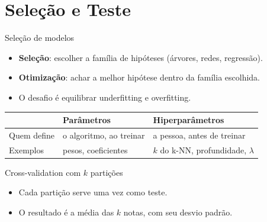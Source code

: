 \documentclass[10pt]{beamer}
\begin{document}
\section{Seleção e Teste}

\begin{frame}{Seleção de modelos}
\begin{itemize}
 \item \textbf{Seleção}: escolher a família de hipóteses (árvores, redes, regressão).
 \item \textbf{Otimização}: achar a melhor hipótese dentro da família escolhida.
 \item O desafio é equilibrar underfitting e overfitting.
\end{itemize}
\vspace{2mm}
\begin{tabularx}{\textwidth}{@{}l X X@{}}
\toprule
 & \textbf{Parâmetros} & \textbf{Hiperparâmetros} \\
\midrule
Quem define & o algoritmo, ao treinar & a pessoa, antes de treinar \\
Exemplos & pesos, coeficientes & $k$ do k-NN, profundidade, $\lambda$ \\
\bottomrule
\end{tabularx}
\end{frame}

\begin{frame}{Cross-validation com $k$ partições}
\centering
{}

\begin{itemize}\small
 \item Cada partição serve uma vez como teste.
 \item O resultado é a média das $k$ notas, com seu desvio padrão.
\end{itemize}
\end{frame}
\end{document}
